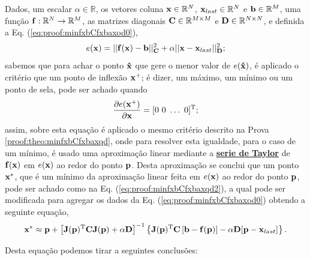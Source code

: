 \begin{myproofT}\label{proof:theo:minfxbCfxbaxod}
Dados,
um escalar $\alpha\in \mathbb{R}$,
os vetores coluna $\VECTOR{x}\in \mathbb{R}^N$, 
$\VECTOR{x}_{last}\in \mathbb{R}^N$ e
$\VECTOR{b}\in \mathbb{R}^M$,  
uma função $\VECTOR{f}:\mathbb{R}^{N} \rightarrow \mathbb{R}^{M}$, 
as matrizes diagonais $\MATRIX{C} \in \mathbb{R}^{M\times M}$ e $\MATRIX{D} \in \mathbb{R}^{N\times N}$, e 
definida a Eq. (\ref{eq:proof:minfxbCfxbaxod0}),
\begin{equation}\label{eq:proof:minfxbCfxbaxod0}
e(\VECTOR{x})=||\VECTOR{f}(\VECTOR{x})-\VECTOR{b}||_{\MATRIX{C}}^2+\alpha||\VECTOR{x}-\VECTOR{x}_{last}||_{\MATRIX{D}}^2;
\end{equation}
sabemos que para achar o ponto $\VECTOR{\hat{x}}$ que gere o menor valor de $e(\VECTOR{\hat{x}})$, é aplicado
o critério que um ponto de inflexão $\VECTOR{x}^+$; é dizer, um máximo, um mínimo ou um ponto de sela, pode ser achado quando 
\begin{equation}
\frac{\partial e(\VECTOR{x}^+)}{\partial \VECTOR{x} }=[0~ 0~ \hdots~ 0 ]^{\transpose};
\end{equation}
assim,  sobre esta equação é aplicado
o mesmo critério descrito na Prova \ref{proof:theo:minfxbCfxbaxqd},
onde para resolver esta igualdade, para o caso de um mínimo, 
é usado uma aproximação linear
mediante a \hyperref[def:taylor]{\textbf{serie de Taylor}} de $\VECTOR{f}(\VECTOR{x})$ em $e(\VECTOR{x})$
ao redor do ponto $\VECTOR{p}$. 
Desta aproximação se conclui que um ponto $\VECTOR{x}^*$, que é 
um mínimo da aproximação linear feita em $e(\VECTOR{x})$ ao redor do ponto $\VECTOR{p}$,
pode ser achado como na Eq. (\ref{eq:proof:minfxbCfxbaxqd2}), 
a qual pode ser modificada para agregar os dados da Eq.  (\ref{eq:proof:minfxbCfxbaxod0}) 
obtendo a seguinte equação,
\begin{equation}\label{eq:proof:minfxbCfxbaxod2}
\VECTOR{x}^* \approx \VECTOR{p} +
\left[ \MATRIX{J}(\VECTOR{p})^{\transpose}\MATRIX{C} \MATRIX{J}(\VECTOR{p})+\alpha \MATRIX{D} \right]^{-1}
\left\{ \MATRIX{J}(\VECTOR{p})^{\transpose}\MATRIX{C} \left[\VECTOR{b}-\VECTOR{f}(\VECTOR{p})\right]-\alpha\MATRIX{D}[\VECTOR{p}-\VECTOR{x}_{last}]\right\}.
\end{equation}

Desta equação podemos tirar a seguintes conclusões:
\begin{itemize}


\end{itemize}
\end{myproofT}
